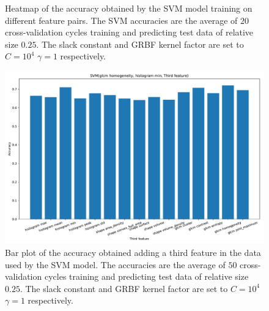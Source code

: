 \begin{figure}[H]
\centering
{}
\caption{Heatmap of the accuracy obtained by the SVM model training on different feature pairs. The SVM accuracies are the average 
of $20$ cross-validation cycles training and predicting test data of relative size $0.25$.
The slack constant and GRBF kernel factor are set to $C=10^4$  $\gamma=1 $ respectively. }
\label{fig:Figures-feature_pairs4}
\end{figure}

\begin{figure}[H]
\centering
\includegraphics[width=1\textwidth]{Figures/third_feature4}
\caption{Bar plot of the accuracy obtained adding a third feature in the data used 
by the SVM model. The accuracies are the average 
of $50$ cross-validation cycles training and predicting test data of relative size $0.25$.
The slack constant and GRBF kernel factor are set to $C=10^4$  $\gamma=1 $ respectively. }
\label{fig:Figures-third_feature4}
\end{figure}



